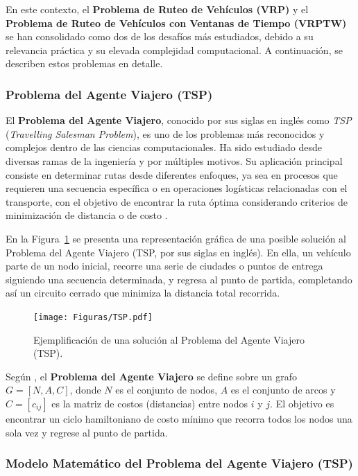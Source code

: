 \documentclass[12pt,titlepage,twoside,openright]{book}
\begin{document}
En este contexto, el \textbf{Problema de Ruteo de Vehículos (VRP)} y el \textbf{Problema de Ruteo de Vehículos con Ventanas de Tiempo (VRPTW)} se han consolidado como dos de los desafíos más estudiados, debido a su relevancia práctica y su elevada complejidad computacional. A continuación, se describen estos problemas en detalle.
\subsubsection{Problema del Agente Viajero (TSP)}
\label{subsec:problem_tsp}

El \textbf{Problema del Agente Viajero}, conocido por sus siglas en inglés como \textit{TSP} (\emph{Travelling Salesman Problem}), es uno de los problemas más reconocidos y complejos dentro de las ciencias computacionales. Ha sido estudiado desde diversas ramas de la ingeniería y por múltiples motivos. Su aplicación principal consiste en determinar rutas desde diferentes enfoques, ya sea en procesos que requieren una secuencia específica o en operaciones logísticas relacionadas con el transporte, con el objetivo de encontrar la ruta óptima considerando criterios de minimización de distancia o de costo \citep{lopez2014tabu}.

En la Figura~\ref{fig:tsp} se presenta una representación gráfica de una posible solución al Problema del Agente Viajero (TSP, por sus siglas en inglés). En ella, un vehículo parte de un nodo inicial, recorre una serie de ciudades o puntos de entrega siguiendo una secuencia determinada, y regresa al punto de partida, completando así un circuito cerrado que minimiza la distancia total recorrida.

\begin{figure}[H]
	\centering
	\texttt{[image: Figuras/TSP.pdf]}
	\caption{Ejemplificación de una solución al Problema del Agente Viajero (TSP).}
	\label{fig:tsp}
\end{figure}



Según \citep{torres2018}, el \textbf{Problema del Agente Viajero} se define sobre un grafo \(G = [N,A,C]\), donde \(N\) es el conjunto de nodos, \(A\) es el conjunto de arcos y \(C = [c_{ij}]\) es la matriz de costos (distancias) entre nodos \(i\) y \(j\). El objetivo es encontrar un ciclo hamiltoniano de costo mínimo que recorra todos los nodos una sola vez y regrese al punto de partida.

\subsubsection*{Modelo Matemático del Problema del Agente Viajero (TSP)}
\end{document}
